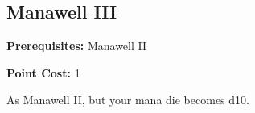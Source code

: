 \subsection*{Manawell III}\label{feat:manawell3}

\noindent
\textbf{Prerequisites:} Manawell II

\noindent
\textbf{Point Cost:} 1 

As Manawell II, but your mana die becomes d10.
